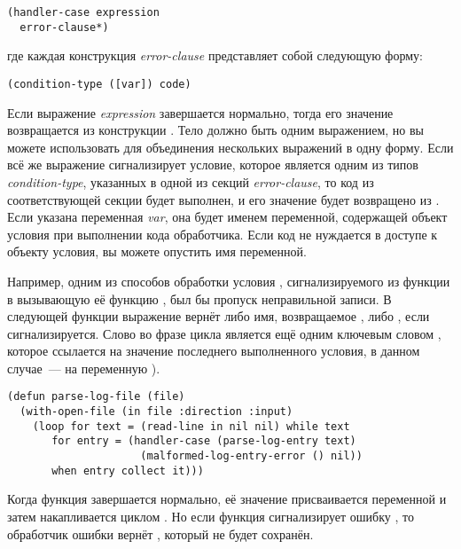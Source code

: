 \begin{lstlisting}
(handler-case expression
  error-clause*)
\end{lstlisting}

где каждая конструкция \textit{error-clause} представляет собой следующую форму:

\begin{lstlisting}
(condition-type ([var]) code)
\end{lstlisting}

Если выражение \textit{expression} завершается нормально, тогда его значение возвращается
из конструкции . Тело  должно быть одним выражением,
но вы можете использовать  для объединения нескольких выражений в одну
форму. Если всё же выражение сигнализирует условие, которое является одним из типов
\textit{condition-type}, указанных в одной из секций \textit{error-clause}, то код из
соответствующей секции будет выполнен, и его значение будет возвращено из
. Если указана переменная \textit{var}, она будет именем переменной,
содержащей объект условия при выполнении кода обработчика. Если код не нуждается в доступе
к объекту условия, вы можете опустить имя переменной.

Например, одним из способов обработки условия ,
сигнализируемого из функции  в вызывающую её функцию
, был бы пропуск неправильной записи. В следующей функции выражение
 вернёт либо имя, возвращаемое , либо ,
если  сигнализируется. Слово  во фразе
 цикла  является ещё одним ключевым словом ,
которое ссылается на значение последнего выполненного условия, в данном случае~--- на
переменную ).

\begin{lstlisting}
(defun parse-log-file (file)
  (with-open-file (in file :direction :input)
    (loop for text = (read-line in nil nil) while text
       for entry = (handler-case (parse-log-entry text)
                     (malformed-log-entry-error () nil))
       when entry collect it)))
\end{lstlisting}

Когда функция  завершается нормально, её значение присваивается
переменной  и затем накапливается циклом . Но если функция
 сигнализирует ошибку , то
обработчик ошибки вернёт , который не будет сохранён.

